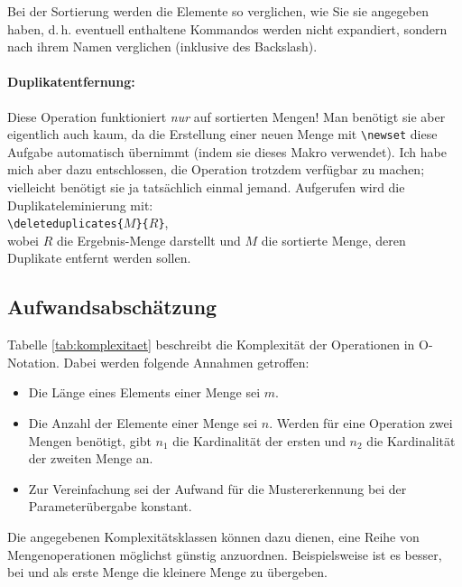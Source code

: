 Bei der Sortierung werden die Elemente so verglichen, wie Sie sie angegeben haben, d.\,h. eventuell enthaltene Kommandos werden nicht expandiert, sondern nach ihrem Namen verglichen (inklusive des Backslash).

\paragraph{Duplikatentfernung:} Diese Operation funktioniert \emph{nur} auf sortierten Mengen! Man benötigt sie aber eigentlich auch kaum, da die Erstellung einer neuen Menge mit \verb|\newset| diese Aufgabe automatisch übernimmt (indem sie dieses Makro verwendet). Ich habe mich aber dazu entschlossen, die Operation trotzdem verfügbar zu machen; vielleicht benötigt sie ja tatsächlich einmal jemand.
Aufgerufen wird die Duplikateleminierung mit:\\
\mbox{}\hspace{2em}\verb|\deleteduplicates{|$M$\verb|}{|$R$\verb|}|,\\
wobei $R$ die Ergebnis-Menge darstellt und $M$ die sortierte Menge, deren Duplikate entfernt werden sollen.

\subsection{Aufwandsabschätzung}
Tabelle \ref{tab:komplexitaet} beschreibt die Komplexität der Operationen in O-Notation. Dabei werden folgende Annahmen getroffen:
\begin{itemize}
  \item Die Länge eines Elements einer Menge sei $m$.
  \item Die Anzahl der Elemente einer Menge sei $n$. Werden für eine Operation zwei Mengen benötigt, gibt $n_1$ die Kardinalität der ersten und $n_2$ die Kardinalität der zweiten Menge an.
  \item Zur Vereinfachung sei der Aufwand für die Mustererkennung bei der Parameterübergabe konstant.
\end{itemize}

Die angegebenen Komplexitätsklassen können dazu dienen, eine Reihe von Mengenoperationen möglichst günstig anzuordnen. Beispielsweise ist es besser, bei \verb@\intersectsets@ und \verb@\minussets@ als erste Menge die kleinere Menge zu übergeben.

